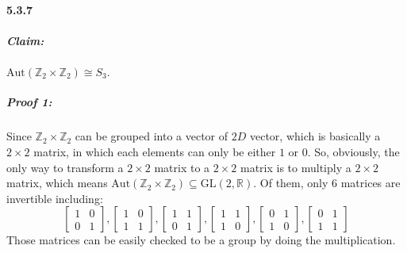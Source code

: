 \documentclass[11pt]{article}
\begin{document}
		\paragraph{5.3.7}
			\subparagraph{Claim:} $\mathrm{Aut}(\mathbb{Z}_2 \times \mathbb{Z}_2) \cong S_3.$			
			\subparagraph{Proof 1:} Since $\mathbb{Z}_2 \times \mathbb{Z}_2$ can be grouped into a vector of $2D$ vector, which is basically a $2 \times 2$ matrix, in which each elements can only be either $1$ or $0$. So, obviously, the only way to transform a $2 \times 2$ matrix to a $2 \times 2$ matrix is to multiply a $2 \times 2$ matrix, which means $\mathrm{Aut}(\mathbb{Z}_2 \times \mathbb{Z}_2) \subseteq \mathrm{GL}(2, \mathbb{R})$. Of them, only $6$ matrices are invertible including:
					\[
						\begin{bmatrix}
							1 & 0\\
							0 & 1
						\end{bmatrix}
						,
						\begin{bmatrix}
							1 & 0\\
							1 & 1
						\end{bmatrix}
						,
						\begin{bmatrix}
							1 & 1\\
							0 & 1
						\end{bmatrix}
						,
						\begin{bmatrix}
							1 & 1\\
							1 & 0
						\end{bmatrix}
						,
						\begin{bmatrix}
							0 & 1\\
							1 & 0
						\end{bmatrix}
						,
						\begin{bmatrix}
							0 & 1\\
							1 & 1
						\end{bmatrix}
					\]
					Those matrices can be easily checked to be a group by doing the multiplication.
					
\end{document}
